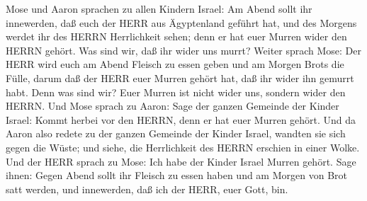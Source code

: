  Mose und Aaron sprachen zu allen Kindern Israel: Am Abend
sollt ihr innewerden, daß euch der HERR aus Ägyptenland geführt hat,
 und des Morgens werdet ihr des HERRN Herrlichkeit sehen;
denn er hat euer Murren wider den HERRN gehört. Was sind wir, daß ihr
wider uns murrt?  Weiter sprach Mose: Der HERR wird euch am
Abend Fleisch zu essen geben und am Morgen Brots die Fülle, darum daß
der HERR euer Murren gehört hat, daß ihr wider ihn gemurrt habt. Denn
was sind wir? Euer Murren ist nicht wider uns, sondern wider den HERRN.
 Und Mose sprach zu Aaron: Sage der ganzen Gemeinde der
Kinder Israel: Kommt herbei vor den HERRN, denn er hat euer Murren
gehört.  Und da Aaron also redete zu der ganzen Gemeinde
der Kinder Israel, wandten sie sich gegen die Wüste; und siehe, die
Herrlichkeit des HERRN erschien in einer Wolke.  Und der
HERR sprach zu Mose:  Ich habe der Kinder Israel Murren
gehört. Sage ihnen: Gegen Abend sollt ihr Fleisch zu essen haben und am
Morgen von Brot satt werden, und innewerden, daß ich der HERR, euer
Gott, bin.

